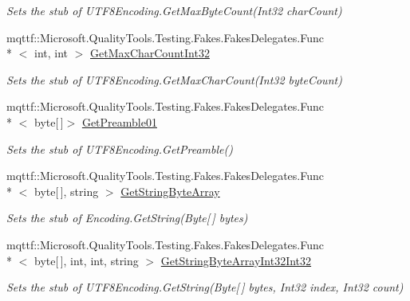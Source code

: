 \begin{DoxyCompactItemize}
\begin{DoxyCompactList}\small\item\em Sets the stub of U\-T\-F8\-Encoding.\-Get\-Max\-Byte\-Count(\-Int32 char\-Count)\end{DoxyCompactList}\item 
mqttf\-::\-Microsoft.\-Quality\-Tools.\-Testing.\-Fakes.\-Fakes\-Delegates.\-Func\\*
$<$ int, int $>$ \hyperlink{class_system_1_1_text_1_1_fakes_1_1_stub_u_t_f8_encoding_a3cc0978c605daf5beda7aa6cede3013c}{Get\-Max\-Char\-Count\-Int32}
\begin{DoxyCompactList}\small\item\em Sets the stub of U\-T\-F8\-Encoding.\-Get\-Max\-Char\-Count(\-Int32 byte\-Count)\end{DoxyCompactList}\item 
mqttf\-::\-Microsoft.\-Quality\-Tools.\-Testing.\-Fakes.\-Fakes\-Delegates.\-Func\\*
$<$ byte\mbox{[}$\,$\mbox{]}$>$ \hyperlink{class_system_1_1_text_1_1_fakes_1_1_stub_u_t_f8_encoding_a153a9d57c5d334635231426664b6b948}{Get\-Preamble01}
\begin{DoxyCompactList}\small\item\em Sets the stub of U\-T\-F8\-Encoding.\-Get\-Preamble()\end{DoxyCompactList}\item 
mqttf\-::\-Microsoft.\-Quality\-Tools.\-Testing.\-Fakes.\-Fakes\-Delegates.\-Func\\*
$<$ byte\mbox{[}$\,$\mbox{]}, string $>$ \hyperlink{class_system_1_1_text_1_1_fakes_1_1_stub_u_t_f8_encoding_a1f207559b89b8de22c96049099a57b8e}{Get\-String\-Byte\-Array}
\begin{DoxyCompactList}\small\item\em Sets the stub of Encoding.\-Get\-String(\-Byte\mbox{[}$\,$\mbox{]} bytes)\end{DoxyCompactList}\item 
mqttf\-::\-Microsoft.\-Quality\-Tools.\-Testing.\-Fakes.\-Fakes\-Delegates.\-Func\\*
$<$ byte\mbox{[}$\,$\mbox{]}, int, int, string $>$ \hyperlink{class_system_1_1_text_1_1_fakes_1_1_stub_u_t_f8_encoding_ae205b3b1f1ec0d76a77e174c78ba8039}{Get\-String\-Byte\-Array\-Int32\-Int32}
\begin{DoxyCompactList}\small\item\em Sets the stub of U\-T\-F8\-Encoding.\-Get\-String(\-Byte\mbox{[}$\,$\mbox{]} bytes, Int32 index, Int32 count)\end{DoxyCompactList}\item 

\end{DoxyCompactItemize}
